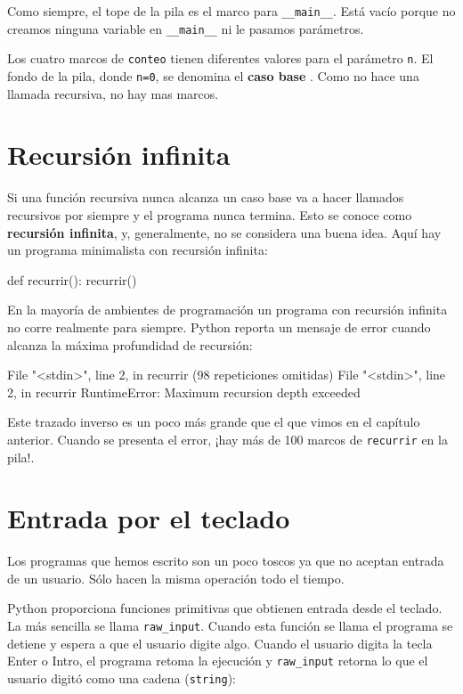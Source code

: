 Como siempre, el tope de la pila es el marco para \texttt{\_\_main\_\_}.
Está vacío porque no creamos ninguna variable en \texttt{\_\_main\_\_}
ni le pasamos parámetros.

Los cuatro marcos de \texttt{conteo} tienen diferentes valores para
el parámetro \texttt{n}. El fondo de la pila, donde \texttt{n=0},
se denomina el \textbf{caso base }. Como no hace una llamada recursiva,
no hay mas marcos.

 

\section{Recursión infinita}

  
 

Si una función recursiva nunca alcanza un caso base va a hacer llamados
recursivos por siempre y el programa nunca termina. Esto se conoce
como \textbf{recursión infinita}, y, generalmente, no se considera
una buena idea. Aquí hay un programa minimalista con recursión infinita:

\begin{pythoncode}
def recurrir():
  recurrir()
\end{pythoncode}
 En la mayoría de ambientes de programación un programa con recursión
infinita no corre realmente para siempre. Python reporta un mensaje
de error cuando alcanza la máxima profundidad de recursión:
\begin{pythoncode}
  File "<stdin>", line 2, in recurrir
  (98 repeticiones omitidas)
  File "<stdin>", line 2, in recurrir
RuntimeError: Maximum recursion depth exceeded
\end{pythoncode}
Este trazado inverso es un poco más grande que el que vimos en el
capítulo anterior. Cuando se presenta el error, ¡hay más de 100 marcos
de \texttt{recurrir} en la pila!.

\section{Entrada por el teclado}

Los programas que hemos escrito son un poco toscos ya que no aceptan
entrada de un usuario. Sólo hacen la misma operación todo el tiempo.

Python proporciona funciones primitivas que obtienen entrada desde
el teclado. La más sencilla se llama \texttt{raw\_input}. Cuando esta
función se llama el programa se detiene y espera a que el usuario
digite algo. Cuando el usuario digita la tecla Enter o Intro, el programa
retoma la ejecución y \texttt{raw\_input} retorna lo que el usuario
digitó como una cadena (\texttt{string}):

